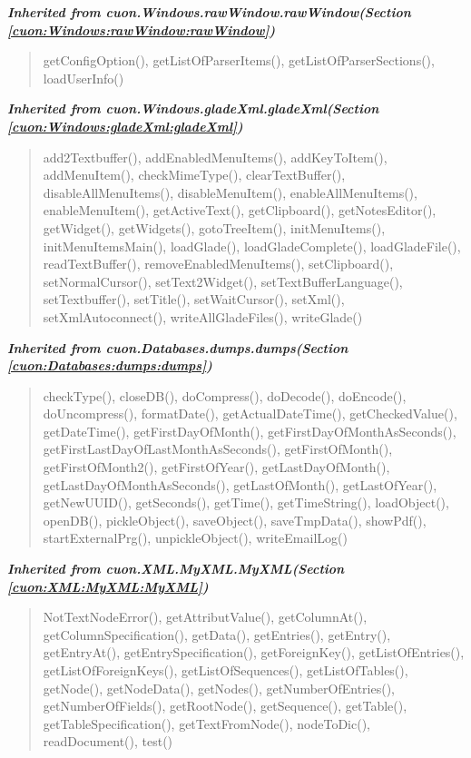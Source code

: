 \large{\textbf{\textit{Inherited from cuon.Windows.rawWindow.rawWindow\textit{(Section \ref{cuon:Windows:rawWindow:rawWindow})}}}}

\begin{quote}
getConfigOption(), getListOfParserItems(), getListOfParserSections(), loadUserInfo()
\end{quote}

\large{\textbf{\textit{Inherited from cuon.Windows.gladeXml.gladeXml\textit{(Section \ref{cuon:Windows:gladeXml:gladeXml})}}}}

\begin{quote}
add2Textbuffer(), addEnabledMenuItems(), addKeyToItem(), addMenuItem(), checkMimeType(), clearTextBuffer(), disableAllMenuItems(), disableMenuItem(), enableAllMenuItems(), enableMenuItem(), getActiveText(), getClipboard(), getNotesEditor(), getWidget(), getWidgets(), gotoTreeItem(), initMenuItems(), initMenuItemsMain(), loadGlade(), loadGladeComplete(), loadGladeFile(), readTextBuffer(), removeEnabledMenuItems(), setClipboard(), setNormalCursor(), setText2Widget(), setTextBufferLanguage(), setTextbuffer(), setTitle(), setWaitCursor(), setXml(), setXmlAutoconnect(), writeAllGladeFiles(), writeGlade()
\end{quote}

\large{\textbf{\textit{Inherited from cuon.Databases.dumps.dumps\textit{(Section \ref{cuon:Databases:dumps:dumps})}}}}

\begin{quote}
checkType(), closeDB(), doCompress(), doDecode(), doEncode(), doUncompress(), formatDate(), getActualDateTime(), getCheckedValue(), getDateTime(), getFirstDayOfMonth(), getFirstDayOfMonthAsSeconds(), getFirstLastDayOfLastMonthAsSeconds(), getFirstOfMonth(), getFirstOfMonth2(), getFirstOfYear(), getLastDayOfMonth(), getLastDayOfMonthAsSeconds(), getLastOfMonth(), getLastOfYear(), getNewUUID(), getSeconds(), getTime(), getTimeString(), loadObject(), openDB(), pickleObject(), saveObject(), saveTmpData(), showPdf(), startExternalPrg(), unpickleObject(), writeEmailLog()
\end{quote}

\large{\textbf{\textit{Inherited from cuon.XML.MyXML.MyXML\textit{(Section \ref{cuon:XML:MyXML:MyXML})}}}}

\begin{quote}
NotTextNodeError(), getAttributValue(), getColumnAt(), getColumnSpecification(), getData(), getEntries(), getEntry(), getEntryAt(), getEntrySpecification(), getForeignKey(), getListOfEntries(), getListOfForeignKeys(), getListOfSequences(), getListOfTables(), getNode(), getNodeData(), getNodes(), getNumberOfEntries(), getNumberOfFields(), getRootNode(), getSequence(), getTable(), getTableSpecification(), getTextFromNode(), nodeToDic(), readDocument(), test()
\end{quote}

